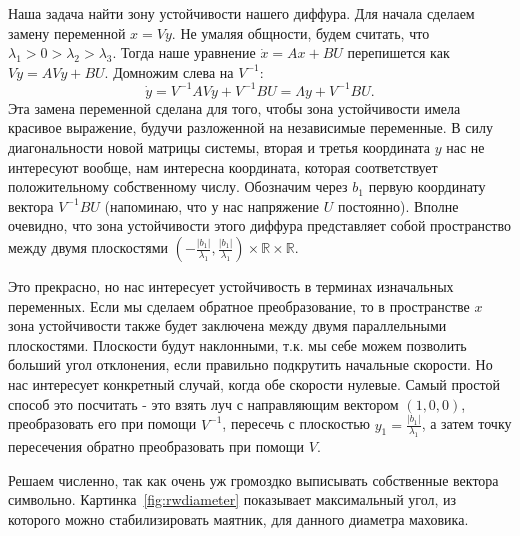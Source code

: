 \documentclass{article}
\begin{document}
Наша задача найти зону устойчивости нашего диффура. Для начала сделаем замену переменной $x=Vy$.
Не умаляя общности, будем считать, что $\lambda_1>0>\lambda_2>\lambda_3$.
Тогда наше уравнение $\dot x = Ax + BU$ перепишется как $V\dot y = AVy + BU$. Домножим слева на $V^{-1}$: 
$$
\dot y = V^{-1}AVy + V^{-1}BU = \Lambda y + V^{-1}BU.
$$
Эта замена переменной сделана для того, чтобы зона устойчивости имела красивое выражение, будучи разложенной на независимые переменные.
В силу диагональности новой матрицы системы, вторая и третья координата $y$ нас не интересуют вообще, нам интересна координата, которая соответствует положительному собственному числу.
Обозначим через $b_1$ первую координату вектора $V^{-1}BU$ (напоминаю, что у нас напряжение $U$ постоянно).
Вполне очевидно, что зона устойчивости этого диффура представляет собой пространство между двумя плоскостями $\left(-\frac{|b_1|}{\lambda_1}, \frac{|b_1|}{\lambda_1} \right) \times \mathbb R \times \mathbb R$.

Это прекрасно, но нас интересует устойчивость в терминах изначальных переменных.
Если мы сделаем обратное преобразование, то в пространстве $x$ зона устойчивости также будет заключена между двумя параллельными плоскостями.
Плоскости будут наклонными, т.к. мы себе можем позволить больший угол отклонения, если правильно подкрутить начальные скорости.
Но нас интересует конкретный случай, когда обе скорости нулевые. Самый простой способ это посчитать - это взять луч с направляющим вектором $(1,0,0)$, преобразовать его при помощи $V^{-1}$,
пересечь с плоскостью $y_1 = \frac{|b_1|}{\lambda_1}$, а затем точку пересечения обратно преобразовать при помощи $V$.

Решаем численно, так как очень уж громоздко выписывать собственные вектора символьно. Картинка~\ref{fig:rwdiameter} показывает максимальный угол, из которого можно стабилизировать маятник, для данного диаметра маховика.







\end{document}
